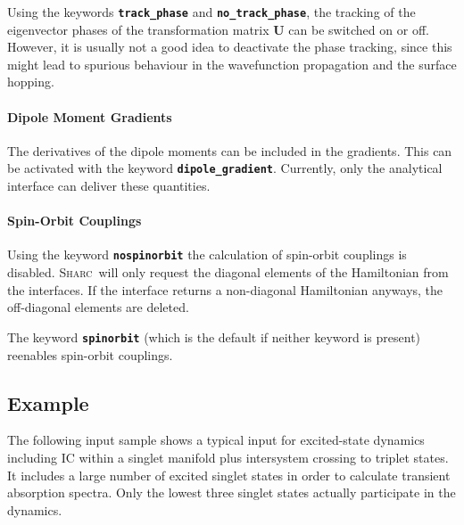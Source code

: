 \documentclass[a4paper,11pt,DIV=15,openany,twoside=false]{scrbook}
\newcommand{\sharc}{\textsc{Sharc}}
\newcommand{\ttt}[1]{\textbf{\texttt{#1}}}
\begin{document}
Using the keywords \ttt{track\_phase} and \ttt{no\_track\_phase}, the tracking of the eigenvector phases of the transformation matrix $\mathbf{U}$ 
can be switched on or off. However, it is usually not a good idea to deactivate the phase tracking, since this might lead to spurious behaviour in the wavefunction propagation and the surface hopping.

\paragraph{Dipole Moment Gradients}

The derivatives of the dipole moments can be included in the gradients. This can be activated with the keyword \ttt{dipole\_gradient}. Currently, only the analytical interface can deliver these quantities.

\paragraph{Spin-Orbit Couplings}

Using the keyword \ttt{nospinorbit} the calculation of spin-orbit couplings is disabled. \sharc\ will only request the diagonal elements of the Hamiltonian from the interfaces. If the interface returns a non-diagonal Hamiltonian anyways, the off-diagonal elements are deleted.

The keyword \ttt{spinorbit} (which is the default if neither keyword is present) reenables spin-orbit couplings.



\subsection{Example}

The following input sample shows a typical input for excited-state dynamics including IC within a singlet manifold plus intersystem crossing to triplet states. It includes a large number of excited singlet states in order to calculate transient absorption spectra. Only the lowest three singlet states actually participate in the dynamics. 
\end{document}
